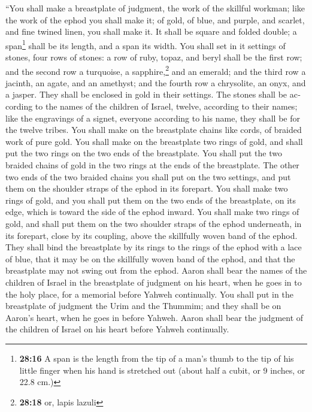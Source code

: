 \begin{paracol}{2}
\begin{otherlanguage}{english}
 ``You shall make a breastplate of judgment, the work of
the skillful workman; like the work of the ephod you shall make it; of
gold, of blue, and purple, and scarlet, and fine twined linen, you shall
make it.  It shall be square and folded double; a
span\footnote{\textbf{28:16} A span is the length from the tip of a
  man's thumb to the tip of his little finger when his hand is stretched
  out (about half a cubit, or 9 inches, or 22.8 cm.)} shall be its
length, and a span its width.  You shall set in it
settings of stones, four rows of stones: a row of ruby, topaz, and beryl
shall be the first row;  and the second row a turquoise,
a sapphire,\footnote{\textbf{28:18} or, lapis lazuli} and an emerald;
 and the third row a jacinth, an agate, and an amethyst;
 and the fourth row a chrysolite, an onyx, and a jasper.
They shall be enclosed in gold in their settings.  The
stones shall be according to the names of the children of Israel,
twelve, according to their names; like the engravings of a signet,
everyone according to his name, they shall be for the twelve tribes.
 You shall make on the breastplate chains like cords, of
braided work of pure gold.  You shall make on the
breastplate two rings of gold, and shall put the two rings on the two
ends of the breastplate.  You shall put the two braided
chains of gold in the two rings at the ends of the breastplate.
 The other two ends of the two braided chains you shall
put on the two settings, and put them on the shoulder straps of the
ephod in its forepart.  You shall make two rings of gold,
and you shall put them on the two ends of the breastplate, on its edge,
which is toward the side of the ephod inward.  You shall
make two rings of gold, and shall put them on the two shoulder straps of
the ephod underneath, in its forepart, close by its coupling, above the
skillfully woven band of the ephod.  They shall bind the
breastplate by its rings to the rings of the ephod with a lace of blue,
that it may be on the skillfully woven band of the ephod, and that the
breastplate may not swing out from the ephod.  Aaron
shall bear the names of the children of Israel in the breastplate of
judgment on his heart, when he goes in to the holy place, for a memorial
before Yahweh continually.  You shall put in the
breastplate of judgment the Urim and the Thummim; and they shall be on
Aaron's heart, when he goes in before Yahweh. Aaron shall bear the
judgment of the children of Israel on his heart before Yahweh
continually.


\end{otherlanguage}
\end{paracol}

